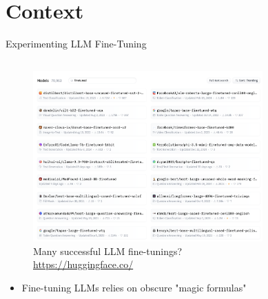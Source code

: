 \documentclass[11pt,aspectratio=169]{beamer}
\begin{document}
\section{Context}

\begin{frame}{Experimenting LLM Fine-Tuning}
    \begin{columns}
        \renewcommand{\thempfootnote}{}
        \begin{column}{0.5\linewidth}
            \vspace{-0.5cm}
            \begin{figure}
                \centering
                \caption*{\centering Many successful LLM fine-tunings?\\{\footnotesize\url{https://huggingface.co/}}}
                \vspace{-0.3cm}
                \includegraphics[width=0.9\textwidth]{finetune_success.png}
            \end{figure}
            \begin{itemize}
                \item<3-> Fine-tuning LLMs relies on obscure "magic formulas"
            \end{itemize}
        \end{column}
        \begin{column}{0.5\linewidth}
            \vspace{-0.8cm}
            \begin{figure}
\end{figure}
\end{column}
\end{columns}
\end{frame}
\end{document}
